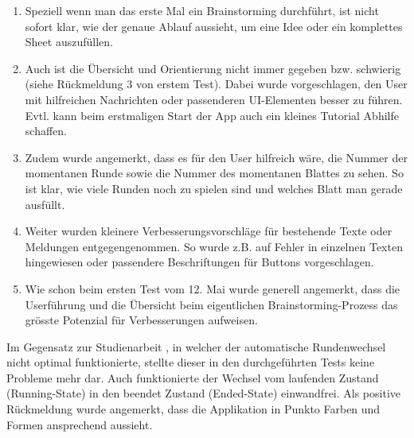 \begin{enumerate}
	\item Speziell wenn man das erste Mal ein Brainstorming durchführt, ist nicht sofort klar, wie der genaue Ablauf aussieht, um eine Idee oder ein komplettes Sheet auszufüllen. 
	\item Auch ist die Übersicht und Orientierung nicht immer gegeben bzw. schwierig (siehe Rückmeldung 3 von erstem Test). Dabei wurde vorgeschlagen, den User mit hilfreichen Nachrichten oder passenderen UI-Elementen besser zu führen. Evtl. kann beim erstmaligen Start der App auch ein kleines Tutorial Abhilfe schaffen.
	\item Zudem wurde angemerkt, dass es für den User hilfreich wäre, die Nummer der momentanen Runde sowie die Nummer des momentanen Blattes zu sehen. So ist klar, wie viele Runden noch zu spielen sind und welches Blatt man gerade ausfüllt.
	\item Weiter wurden kleinere Verbesserungsvorschläge für bestehende Texte oder Meldungen entgegengenommen. So wurde z.B. auf Fehler in einzelnen Texten hingewiesen oder passendere Beschriftungen für Buttons vorgeschlagen.
	\item  Wie schon beim ersten Test vom 12. Mai wurde generell angemerkt, dass die Userführung und die Übersicht beim eigentlichen Brainstorming-Prozess das grösste Potenzial für Verbesserungen aufweisen.
\end{enumerate}

Im Gegensatz zur Studienarbeit \cite{methode635-sa}, in welcher der automatische Rundenwechsel nicht optimal funktionierte, stellte dieser in den durchgeführten Tests keine Probleme mehr dar. Auch funktionierte der Wechsel vom laufenden Zustand (Running-State) in den beendet Zustand (Ended-State) einwandfrei. 
Als positive Rückmeldung wurde angemerkt, dass die Applikation in Punkto Farben und Formen ansprechend aussieht.